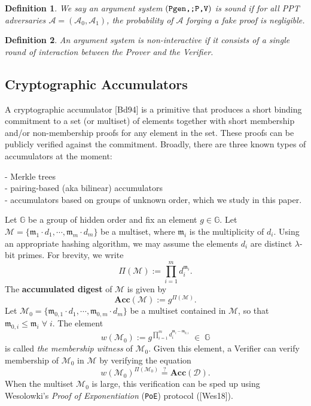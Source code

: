 \documentclass[11pt, lettersize, notitlepage, leqno, footskip=0.6cm]{article}
\newcommand{\pl}{\prod\limits}
\newcommand{\Acc}{\mbf{Acc}}
\newcommand{\mc}{\mathcal}
\newcommand{\mb}{\mathbb}
\newcommand{\mbf}{\mathbf}
\newcommand{\mfm}{\mathfrak{m}}
\newcommand{\lam}{\lambda}
\newcommand{\vs}{\vspace{-0.15cm}}
\newcommand{\noin}{\noindent}
\newcommand{\sta}{\stackrel{?}{=}}
\newtheorem{Def}{Definition}[section]
\numberwithin{equation}{section}
\begin{document}
\begin{Def} \normalfont We say an argument system $\protect{(\verb|Pgen,;P,V|)}$ is \textit{sound} if for all PPT adversaries $\mc{A} = (\mc{A}_0, \mc{A}_1)$, the probability of $\mc{A}$ forging a fake proof is negligible.\end{Def}

\begin{Def} \normalfont An argument system is \textit{non-interactive} if it consists of a single round of interaction between the Prover and the Verifier.\end{Def}



\subsection{\fontsize{11}{11}\selectfont Cryptographic Accumulators }

A cryptographic accumulator [Bd94] is a primitive that produces a short binding commitment to a set (or multiset) of elements together with short membership and/or non-membership proofs for any element in the set. These proofs can be publicly verified against the commitment. Broadly, there are three known types of accumulators at the moment: 

\noin - Merkle trees\\
- pairing-based (aka bilinear) accumulators \\  
- accumulators based on groups of unknown order, which we study in this paper. 

Let $\mb{G}$ be a group of hidden order and fix an element $g \in\mb{G}$. Let $\mc{M}= \{\mfm_1\cdot d_1,\cdots, \mfm_m\cdot d_m\}$ be a multiset, where $\mfm_i$ is the multiplicity of $d_i$. Using an appropriate hashing algorithm, we may assume the elements $d_i$ are distinct $\lam$-bit primes. For brevity, we write \vs $$\Pi(\mc{M}) := \pl_{i=1}^m d_i^{\mfm_i} .$$ The \textbf{accumulated digest} of $\mc{M}$ is given by \vs $$\Acc(\mc{M}):= g^{\Pi(\mc{M})} .$$ Let $\mc{M}_0 = \{\mfm_{0,1}\cdot d_1,\cdots, \mfm_{0,m}\cdot d_m\}$ be a multiset contained in $\mc{M}$, so that  $\mfm_{0,i}\leq \mfm_i\;\forall\;i$. The element \vs $$w(\mc{M}_0):= g^{\pl_{i=1}^m d_i^{\mfm_i - \mfm_{0,i}}}\;\in\;\mb{G} $$ is called \textit{the membership witness} of $\mc{M}_0$. Given this element, a Verifier can verify membership of $\mc{M}_0$ in $\mc{M}$ by verifying the equation \vs $$w(\mc{M}_0)^{\Pi(\mc{M}_0)} \sta \Acc(\mc{D}).$$ When the multiset $\mc{M}_0$ is large, this verification can be sped up using Wesolowki's \textit{Proof of Exponentiation} (\verb|PoE|) protocol ([Wes18]).
\end{document}
